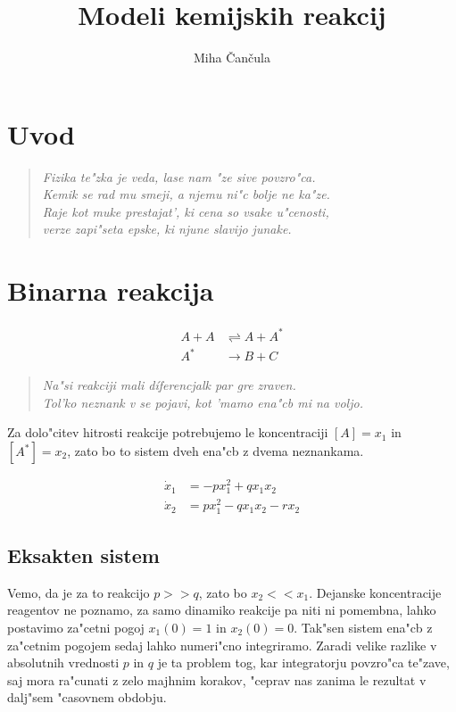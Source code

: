 \documentclass[a4paper,10pt]{article}
\title{Modeli kemijskih reakcij}
\author{Miha \v Can\v cula}
\begin{document}
\maketitle

\section{Uvod}

\begin{verse}
\textit{Fizika te"zka je veda, lase nam "ze sive povzro"ca. \\ 
Kemik se rad mu smeji, a njemu ni"c bolje ne ka"ze. \\
Raje kot muke prestajat', ki cena so vsake u"cenosti, \\
verze zapi"seta epske, ki njune slavijo junake.}
\end{verse}

 \section{Binarna reakcija}

\begin{align}
 A + A &\rightleftharpoons A + A^* \\
 A^* &\rightarrow B + C
\end{align}

\begin{verse}
\textit{Na"si reakciji mali d\'iferencjalk par gre zraven.}  \\
\textit{Tol'ko neznank v se pojavi, kot 'mamo ena"cb mi na voljo.} \\
\end{verse}

\begin{comment}
Reakciji ustreza sistem linearnih ena"cb prvega reda.
\end{comment}

Za dolo"citev hitrosti reakcije potrebujemo le koncentraciji $[A] = x_1$ in $[A^*] = x_2$, zato bo to sistem dveh ena"cb z dvema neznankama. 

\begin{align}
  \dot x_1 &= -p x_1^2 + q x_1 x_2 \label{eq:n1-sistem-1} \\
  \dot x_2 &= p x_1^2 - q x_1 x_2 - r x_2
\end{align}

\subsection{Eksakten sistem}
Vemo, da je za to reakcijo $p >> q$, zato bo $x_2 << x_1$. Dejanske koncentracije reagentov ne poznamo, za samo dinamiko reakcije pa niti ni pomembna, lahko postavimo za"cetni pogoj $x_1(0) = 1$ in $x_2(0) = 0$. Tak"sen sistem ena"cb z za"cetnim pogojem sedaj lahko numeri"cno integriramo. Zaradi velike razlike v absolutnih vrednosti $p$ in $q$ je ta problem tog, kar integratorju povzro"ca te"zave, saj mora ra"cunati z zelo majhnim korakov, "ceprav nas zanima le rezultat v dalj"sem "casovnem obdobju. 
\end{document}
